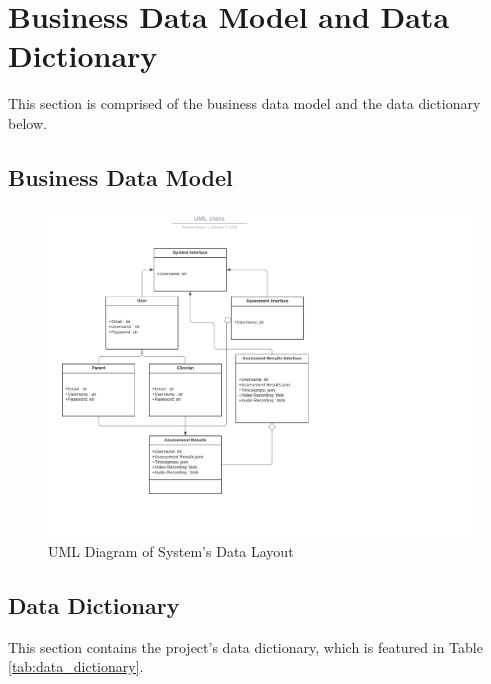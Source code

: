 \documentclass[12pt]{article}
\begin{document}
\newpage

\section{Business Data Model and Data Dictionary}
\hspace{2em}This section is comprised of the business data model and the data dictionary below.
\subsection{Business Data Model}
\begin{figure}[H]
  \centering
  \includegraphics[page=1, trim=0 30 0 50, clip, scale=0.75]{images/UML class.pdf}
  \caption{UML Diagram of System's Data Layout}
\end{figure}

\newpage

\subsection{Data Dictionary}
\hspace{2em} This section contains the project's data dictionary, which is featured in Table \ref{tab:data_dictionary}.
\end{document}
